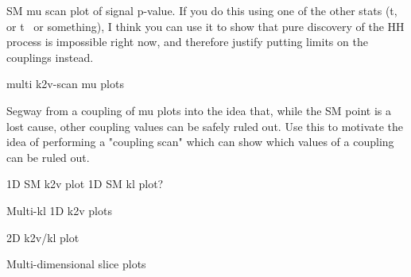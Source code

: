 SM mu scan plot of signal p-value.
If you do this using one of the other stats (t, or t~ or something),
    I think you can use it to show that pure discovery of the HH process is impossible right now,
    and therefore justify putting limits on the couplings instead.

multi k2v-scan mu plots

Segway from a coupling of mu plots into the idea that, while the SM point is a lost cause,
    other coupling values can be safely ruled out.
Use this to motivate the idea of performing a "coupling scan"
    which can show which values of a coupling can be ruled out.

1D SM k2v plot
1D SM kl plot?

Multi-kl 1D k2v plots

2D k2v/kl plot

Multi-dimensional slice plots
